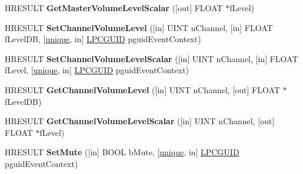 \begin{DoxyCompactItemize}
\item 
\mbox{\label{interface_i_audio_endpoint_volume_ac935293c1913ab707fabc36a65ecd305}} 
H\+R\+E\+S\+U\+LT {\bfseries Get\+Master\+Volume\+Level\+Scalar} (\mbox{[}out\mbox{]} F\+L\+O\+AT $\ast$f\+Level)
\item 
\mbox{\label{interface_i_audio_endpoint_volume_ae5a3f299a694baec68ce325e39a0fa9c}} 
H\+R\+E\+S\+U\+LT {\bfseries Set\+Channel\+Volume\+Level} (\mbox{[}in\mbox{]} U\+I\+NT n\+Channel, \mbox{[}in\mbox{]} F\+L\+O\+AT f\+Level\+DB, \mbox{[}\hyperlink{interfaceunique}{unique}, in\mbox{]} \hyperlink{interface_g_u_i_d}{L\+P\+C\+G\+U\+ID} pguid\+Event\+Context)
\item 
\mbox{\label{interface_i_audio_endpoint_volume_a4ba7ad45bd2445a96a3f9f69c9076c52}} 
H\+R\+E\+S\+U\+LT {\bfseries Set\+Channel\+Volume\+Level\+Scalar} (\mbox{[}in\mbox{]} U\+I\+NT n\+Channel, \mbox{[}in\mbox{]} F\+L\+O\+AT f\+Level, \mbox{[}\hyperlink{interfaceunique}{unique}, in\mbox{]} \hyperlink{interface_g_u_i_d}{L\+P\+C\+G\+U\+ID} pguid\+Event\+Context)
\item 
\mbox{\label{interface_i_audio_endpoint_volume_a831242279853ba15f68989358394d521}} 
H\+R\+E\+S\+U\+LT {\bfseries Get\+Channel\+Volume\+Level} (\mbox{[}in\mbox{]} U\+I\+NT n\+Channel, \mbox{[}out\mbox{]} F\+L\+O\+AT $\ast$f\+Level\+DB)
\item 
\mbox{\label{interface_i_audio_endpoint_volume_a5c71763cef85a42e4a2bbee7694f3503}} 
H\+R\+E\+S\+U\+LT {\bfseries Get\+Channel\+Volume\+Level\+Scalar} (\mbox{[}in\mbox{]} U\+I\+NT n\+Channel, \mbox{[}out\mbox{]} F\+L\+O\+AT $\ast$f\+Level)
\item 
\mbox{\label{interface_i_audio_endpoint_volume_a008d85a2fd8b43a7a9bde215916b2fb9}} 
H\+R\+E\+S\+U\+LT {\bfseries Set\+Mute} (\mbox{[}in\mbox{]} B\+O\+OL b\+Mute, \mbox{[}\hyperlink{interfaceunique}{unique}, in\mbox{]} \hyperlink{interface_g_u_i_d}{L\+P\+C\+G\+U\+ID} pguid\+Event\+Context)
\item 
\mbox{\label{interface_i_audio_endpoint_volume_a0708d9dd870b3d360dfa059ad5430289}} 

\end{DoxyCompactItemize}
